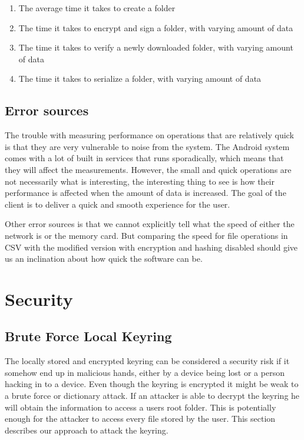 \documentclass[pdftex,english,10pt,b5paper,twoside]{book}
\begin{document}
\begin{enumerate}
    \item The average time it takes to create a folder
    \item The time it takes to encrypt and sign a folder, with varying amount
    of data
    \item The time it takes to verify a newly downloaded folder, with varying
    amount of data
    \item The time it takes to serialize a folder, with varying amount of data
\end{enumerate}

\subsection{Error sources}
The trouble with measuring performance on operations that are relatively quick
is that they are very vulnerable to noise from the system. The Android system
comes with a lot of built in services that runs sporadically, which means that
they will affect the measurements. However, the small and quick operations are
not necessarily what is interesting, the interesting thing to see is how their
performance is affected when the amount of data is increased. The goal of the
client is to deliver a quick and smooth experience for the user. 

Other error sources is that we cannot explicitly tell what the speed of either
the network is or the memory card. But comparing the speed for file operations
in CSV with the modified version with encryption and hashing disabled should
give us an inclination about how quick the software can be.
\section{Security}

\subsection{Brute Force Local Keyring} \label{sec:BFLK} The locally stored and
encrypted keyring can be considered a security risk if it somehow end up in
malicious hands, either by a device being lost or a person hacking in to a
device. Even though the keyring is encrypted it might be weak to a brute force
or dictionary attack. If an attacker is able to decrypt the keyring he will
obtain the information to access a users root folder. This is potentially
enough for the attacker to access every file stored by the user. This section
describes our approach to attack the keyring.
\end{document}
